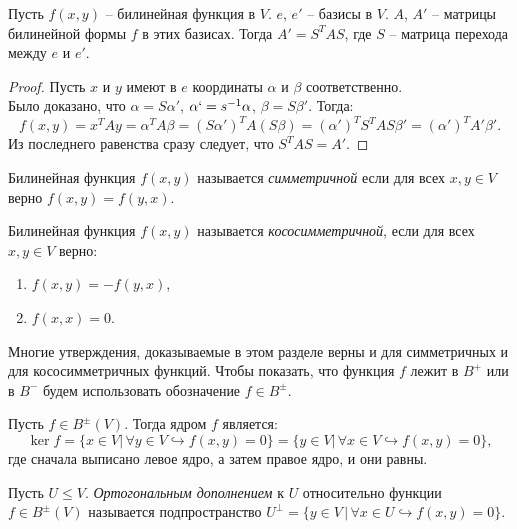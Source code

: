 \begin{proposition}
    Пусть $f(x, y)$ -- билинейная функция в $V$. $e$, $e'$ -- базисы в $V$. $A$, $A'$ -- матрицы билинейной формы $f$ в этих базисах. Тогда $A' = S^T A S$, где $S$ -- матрица перехода между $e$ и $e'$. 
\end{proposition}

\begin{proof}
    Пусть $x$ и $y$ имеют в $e$ координаты $\alpha$ и $\beta$ соответственно.\\ Было доказано, что $\alpha = S \alpha'$, $\alpha` = s^{-1} \alpha$, $\beta = S \beta'$. Тогда:
    $$f(x, y) = x^T A y = \alpha^T A \beta = (S \alpha')^T A (S \beta) = (\alpha')^T S^T A S \beta' = (\alpha')^T A' \beta'.$$ Из последнего равенства сразу следует, что $S^T A S = A'$.
\end{proof}

\begin{definition}
    Билинейная функция $f(x, y)$ называется \textit{симметричной} если для всех $x, y \in V$ верно 
    $f(x, y) = f(y, x)$.
\end{definition}

\begin{definition}
    Билинейная функция $f(x, y)$ называется \textit{кососимметричной}, если для всех $x, y \in V$ верно:
    \begin{enumerate}
        \item $f(x, y) = -f(y, x)$,
        \item $f(x, x) = 0$.
    \end{enumerate}
\end{definition}

\begin{agreement}
    Многие утверждения, доказываемые в этом разделе верны и для симметричных и для кососимметричных 
    функций. Чтобы показать, что функция $f$ лежит в $B^+$ или в $B^-$ будем использовать 
    обозначение $f \in B^{\pm}$.
\end{agreement}

\begin{definition}
    \label{def8.5}
    Пусть $f \in B^{\pm}(V)$. Тогда ядром $f$ является: 
    $$\ker f = \{x \in V \vert \, \forall y \in V \hookrightarrow f(x, y) = 0\} = 
    \{y \in V \vert \, \forall x \in V \hookrightarrow f(x, y) = 0\},$$ 
    где сначала выписано левое ядро, а затем правое ядро, и они равны.
\end{definition}

\begin{definition}
    Пусть $U \leq V$. \textit{Ортогональным дополнением} к $U$ относительно функции $f \in B^{\pm}(V)$ 
    называется подпространство $U^{\perp} = \{y \in V \,\vert \, \forall x \in U \hookrightarrow 
    f(x, y) = 0\}$.
\end{definition}

